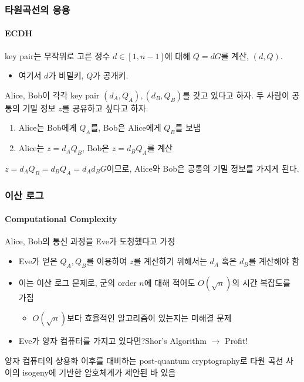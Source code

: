 \documentclass[aspectratio=169,mathserif]{beamer}
\begin{document}
  \begin{frame}
    \frametitle{타원곡선의 응용}
    \framesubtitle{ECDH}

    key pair는 무작위로 고른 정수 \(d\in [1,n-1]\)에 대해 \(Q=dG\)를 계산, \((d,Q)\).
    \begin{itemize}
      \item 여기서 \(d\)가 비밀키, \(Q\)가 공개키.
    \end{itemize}
    \pause
    Alice, Bob이 각각 key pair \((d_A,Q_A), (d_B,Q_B)\)를 갖고 있다고 하자. 두 사람이 공통의 기밀 정보 \(z\)를 공유하고 싶다고 하자.
    \begin{enumerate}
      \item Alice는 Bob에게 \(Q_A\)를, Bob은 Alice에게 \(Q_B\)를 보냄
      \item Alice는 \(z = d_A Q_B\), Bob은 \(z = d_B Q_A\)를 계산
    \end{enumerate}
    \pause
    \(z = d_A Q_B = d_B Q_A = d_A d_B G\)이므로, Alice와 Bob은 공통의 기밀 정보를 가지게 된다.
  \end{frame}

  \begin{frame}
    \frametitle{이산 로그}
    \framesubtitle{Computational Complexity}

    Alice, Bob의 통신 과정을 Eve가 도청했다고 가정
    \pause
    \begin{itemize}
      \item Eve가 얻은 \(Q_A, Q_B\)를 이용하여 \(z\)를 계산하기 위해서는 \(d_A\) 혹은 \(d_B\)를 계산해야 함
      \item 이는 이산 로그 문제로, 군의 order \(n\)에 대해 적어도 \(O(\sqrt{n})\)의 시간 복잡도를 가짐
      \pause
      \begin{itemize}
        \item \(O(\sqrt{n})\)보다 효율적인 알고리즘이 있는지는 미해결 문제
      \end{itemize}
      \pause
      \item Eve가 양자 컴퓨터를 가지고 있다면?\pause\quad Shor's Algorithm \(\rightarrow\) Profit!
    \end{itemize}
    \pause
    양자 컴퓨터의 상용화 이후를 대비하는 post-quantum cryptography로 타원 곡선 사이의 isogeny에 기반한 암호체계가 제안된 바 있음
  \end{frame}
\end{document}
